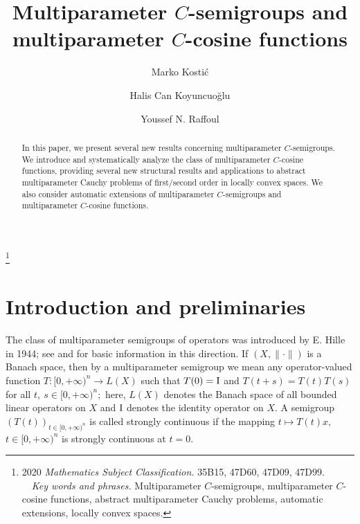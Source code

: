 \documentclass{amsart}
\theoremstyle{definition}
\theoremstyle{remark}
\numberwithin{equation}{section}
\begin{document}
\title[Multiparameter $C$-semigroups and  multiparameter $C$-cosine...]{Multiparameter $C$-semigroups and  multiparameter $C$-cosine functions}

\author{Marko Kosti\' c}
\address{Faculty of Technical Sciences,
University of Novi Sad,
Trg D. Obradovi\' ca 6, 21125 Novi Sad, Serbia}

\author{Halis Can Koyuncuo\u{g}lu}
\address{Department of Engineering,
Sciences\\Izmir Katip Celebi University, 35620, Cigli, Izmir, Turkey}

\author{Youssef N. Raffoul}
\address{Department of Mathematics,
University of Dayton,
Dayton, OH 45469-2316 USA}

{\renewcommand{\thefootnote}{} \footnote{2020 {\it Mathematics
Subject Classification.} 35B15, 47D60, 47D09, 47D99.
\\ \text{  }  \ \    {\it Key words and phrases.} Multiparameter $C$-semigroups, multiparameter $C$-cosine functions, abstract multiparameter Cauchy problems, automatic extensions, locally convex spaces.}}

\begin{abstract}
In this paper, we present several new results concerning multiparameter $C$-semigroups. We introduce and systematically analyze the class of multiparameter $C$-cosine functions, providing several new structural results and applications to abstract multiparameter Cauchy problems of first/second order in locally convex spaces. We also consider automatic extensions of multiparameter $C$-semigroups and multiparameter $C$-cosine functions. 
\end{abstract}
\maketitle

\section{Introduction and preliminaries}

The class of multiparameter semigroups of operators was introduced by E. Hille in 1944; see \cite{bberens} and \cite{hill} for basic information in this direction. 
If $(X,\| \cdot \|)$ is a Banach space, then by a multiparameter semigroup we mean any
operator-valued function $T : [0,+\infty)^{n} \rightarrow L(X)$ such that $T(0)={\rm I}$ and $T(t+s)=T(t)T(s)$ for all $t,\ s\in [0,+\infty)^{n};$ here, $L(X)$ denotes the Banach space of all bounded linear operators on $X$ and ${\rm I}$ denotes the identity operator on $X$. A semigroup  $(T(t))_{t\in [0,+\infty)^{n}}$ is called strongly continuous if the mapping $t\mapsto T(t)x,$ $t\in [0,+\infty)^{n}$ is strongly continuous at $t=0.$ 
\end{document}
